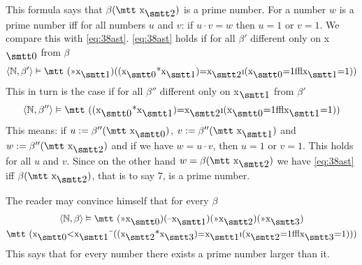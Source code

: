 This formula says that $\beta(\mbox{\mtt x$_{\szwei}$})$ is a 
prime number. For a number $w$ is a prime number iff for all numbers
$u$ and $v$: if $u \cdot v = w$ then $u = 1$ or $v = 1$.
We compare this with \eqref{eq:38ast}. \eqref{eq:38ast} holds if
for all $\beta'$ different only on \mbox{\mtt x$_{\snull}$} 
from $\beta$
\begin{equation}
\auf \BN, \beta'\zu \vDash
    \mbox{\mtt (\symbol{20}x$_{\seins}$)((x$_{\snull}$\symbol{42}x%
$_{\seins}$)\symbol{61}x$_{\szwei}$\symbol{25}(x$_{\snull}$\symbol{61}%
1\symbol{31}x$_{\seins}$\symbol{61}1))} 
\end{equation}
This in turn is the case if for all $\beta''$ different only on 
\mbox{\mtt x$_{\seins}$} from $\beta'$
\begin{equation}
\auf \BN, \beta''\zu \vDash
    \mbox{\mtt ((x$_{\snull}$\symbol{42}x$_{\seins}$)\symbol{61}%
x$_{\szwei}$\symbol{25}(x$_{\snull}$\symbol{61}1\symbol{31}x%
$_{\seins}$\symbol{61}1))} 
\end{equation}
This means: if $u := \beta''(\mbox{\mtt x$_{\snull}$})$, 
$v := \beta''(\mbox{\mtt x$_{\seins}$})$ and $w := \beta''(\mbox{\mtt %
x$_{\szwei}$})$ and if we have $w = u \cdot v$,
then $u = 1$ or $v = 1$. This holds for all $u$ and $v$.
Since on the other hand $w = \beta(\mbox{\mtt x$_{\szwei}$})$ 
we have \eqref{eq:38ast} iff $\beta(\mbox{\mtt x$_{\szwei}$})$, 
that is to say 7, is a prime number.

The reader may convince himself that for every $\beta$
\begin{multline}
\auf \BN, \beta\zu \vDash
    \mbox{\mtt (\symbol{20}x$_{\snull}$)(\symbol{21}x$_{\seins}$)(%
\symbol{20}x$_{\szwei}$)(\symbol{20}x$_{\sdrei}$)} \\
\mbox{\mtt (x$_{\snull}$<x%
$_{\seins}$\symbol{4}((x$_{\szwei}$\symbol{42}x$_{\sdrei})$%
\symbol{61}x$_{\seins}$\symbol{25}(x$_{\szwei}$\symbol{61}1\symbol{31}x%
$_{\sdrei}$\symbol{61}1)))}
\end{multline}
This says that for every number there exists a prime number
larger than it. 

